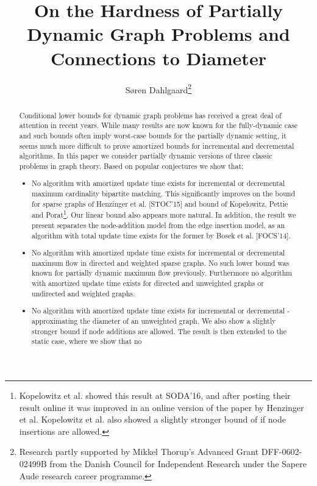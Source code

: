 \documentclass[a4paper,11pt]{article}
\title{On the Hardness of Partially Dynamic Graph Problems and Connections to
Diameter}
\author{Søren Dahlgaard\thanks{Research partly supported by Mikkel Thorup's
        Advanced Grant DFF-0602-02499B from the Danish Council for Independent
Research under the Sapere Aude research career programme.}}
\affil{University of Copenhagen\\\texttt{soerend@di.ku.dk}}
\date{}
\theoremstyle{definition}
\begin{document}
\maketitle

\begin{abstract}
    Conditional lower bounds for dynamic graph problems has received a great
    deal of attention in recent years. While many results are now known for the
    fully-dynamic case and such bounds often imply worst-case bounds for the
    partially dynamic setting, it seems much more difficult to prove amortized
    bounds for incremental and decremental algorithms. In this paper we
    consider partially dynamic versions of three classic problems in graph
    theory. Based on popular conjectures we show that:
    \begin{itemize}
        \item No algorithm with amortized update time  exists
            for incremental or decremental maximum cardinality bipartite
            matching. This significantly improves on the 
            bound for sparse graphs of Henzinger et al. [STOC'15] and
             bound of Kopelowitz, Pettie and
            Porat\footnote{Kopelowitz et al. showed this
                result at SODA'16, and after posting their result online it was
                improved in an online version of the paper by Henzinger et al.
                Kopelowitz et al. also showed a slightly stronger bound of
             if node insertions are allowed.}. Our linear
            bound also appears more natural.
            In addition, the result we present separates
            the node-addition model from the edge insertion model, as an
            algorithm with total update time  exists for the
            former by Bosek et al. [FOCS'14].
        \item No algorithm with amortized update time  exists
            for incremental or decremental maximum flow in directed and
            weighted sparse graphs. No such lower bound was known for
            partially dynamic maximum flow previously. Furthermore no algorithm
            with amortized update time  exists for directed and
            unweighted graphs or undirected and weighted graphs.
        \item No algorithm with amortized update time 
            exists for incremental or decremental -approximating
            the diameter of an unweighted graph. We also show a slightly stronger
            bound if node additions are allowed. The result is then extended to
            the static case, where we show that no 

\end{itemize}
\end{abstract}
\end{document}
